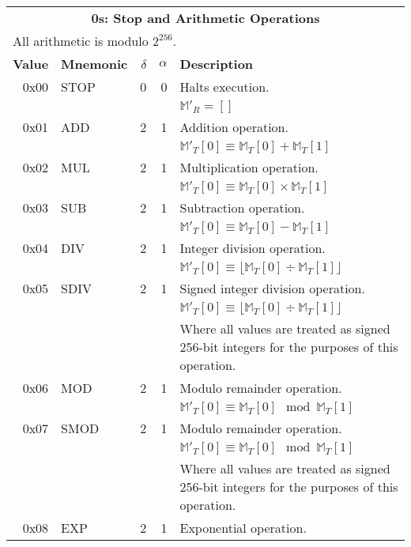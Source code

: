 \documentclass[9pt,oneside]{amsart}
\begin{document}
\begin{tabular*}{\columnwidth}[h]{rlrrl}
\toprule
\multicolumn{5}{c}{\textbf{0s: Stop and Arithmetic Operations}} \\
\multicolumn{5}{l}{All arithmetic is modulo $2^{256}$.} \vspace{5pt} \\
\textbf{Value} & \textbf{Mnemonic} & $\delta$ & $\alpha$ & \textbf{Description} \vspace{5pt} \\
0x00 & {\small STOP} & 0 & 0 & Halts execution. \\
&&&& $\mathbb{M}'_R = []$ \\
\midrule
0x01 & {\small ADD} & 2 & 1 & Addition operation. \\
&&&& $\mathbb{M}'_T[0] \equiv \mathbb{M}_T[0] + \mathbb{M}_T[1]$ \\
\midrule
0x02 & {\small MUL} & 2 & 1 & Multiplication operation. \\
&&&& $\mathbb{M}'_T[0] \equiv \mathbb{M}_T[0] \times \mathbb{M}_T[1]$ \\
\midrule
0x03 & {\small SUB} & 2 & 1 & Subtraction operation. \\
&&&& $\mathbb{M}'_T[0] \equiv \mathbb{M}_T[0] - \mathbb{M}_T[1]$ \\
\midrule
0x04 & {\small DIV} & 2 & 1 & Integer division operation. \\
&&&& $\mathbb{M}'_T[0] \equiv \lfloor\mathbb{M}_T[0] \div \mathbb{M}_T[1]\rfloor$ \\
\midrule
0x05 & {\small SDIV} & 2 & 1 & Signed integer division operation. \\
&&&& $\mathbb{M}'_T[0] \equiv \lfloor\mathbb{M}_T[0] \div \mathbb{M}_T[1]\rfloor$ \\
&&&& Where all values are treated as signed 256-bit integers for the purposes of this operation. \\
\midrule
0x06 & {\small MOD} & 2 & 1 & Modulo remainder operation. \\
&&&& $\mathbb{M}'_T[0] \equiv \mathbb{M}_T[0] \mod{ \mathbb{M}_T[1] }$ \\
\midrule
0x07 & {\small SMOD} & 2 & 1 & Modulo remainder operation. \\
&&&& $\mathbb{M}'_T[0] \equiv \mathbb{M}_T[0] \mod{ \mathbb{M}_T[1] }$ \\
&&&& Where all values are treated as signed 256-bit integers for the purposes of this operation. \\
\midrule
0x08 & {\small EXP} & 2 & 1 & Exponential operation. \\

\end{tabular*}
\end{document}
